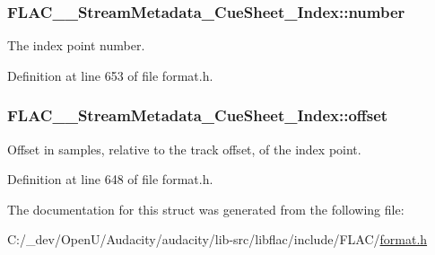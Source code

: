 \subsubsection[{\texorpdfstring{number}{number}}]{ F\+L\+A\+C\+\_\+\+\_\+\+Stream\+Metadata\+\_\+\+Cue\+Sheet\+\_\+\+Index\+::number}\hypertarget{struct_f_l_a_c_____stream_metadata___cue_sheet___index_a71edc33c19a749f1dfb3d1429e08c77a}{}\label{struct_f_l_a_c_____stream_metadata___cue_sheet___index_a71edc33c19a749f1dfb3d1429e08c77a}
The index point number. 

Definition at line 653 of file format.\+h.

\subsubsection[{\texorpdfstring{offset}{offset}}]{ F\+L\+A\+C\+\_\+\+\_\+\+Stream\+Metadata\+\_\+\+Cue\+Sheet\+\_\+\+Index\+::offset}\hypertarget{struct_f_l_a_c_____stream_metadata___cue_sheet___index_ac221421bca83976925e2a41438157bb9}{}\label{struct_f_l_a_c_____stream_metadata___cue_sheet___index_ac221421bca83976925e2a41438157bb9}
Offset in samples, relative to the track offset, of the index point. 

Definition at line 648 of file format.\+h.



The documentation for this struct was generated from the following file\+:\begin{DoxyCompactItemize}
\item 
C\+:/\+\_\+dev/\+Open\+U/\+Audacity/audacity/lib-\/src/libflac/include/\+F\+L\+A\+C/\hyperlink{include_2_f_l_a_c_2format_8h}{format.\+h}\end{DoxyCompactItemize}
